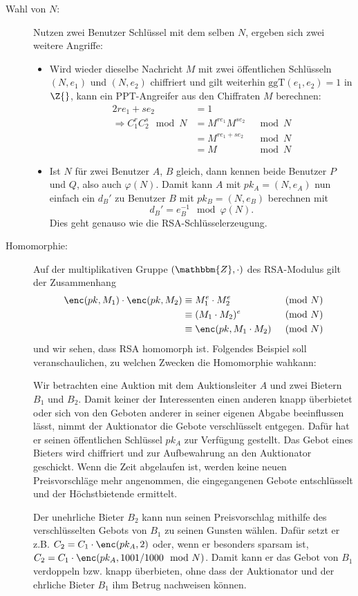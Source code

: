 \begin{description}
\item[Wahl von $N$:] 
  Nutzen zwei Benutzer Schlüssel mit dem selben $N$, ergeben sich zwei
  weitere Angriffe:
  \begin{itemize}
  \item Wird wieder dieselbe Nachricht $M$ mit zwei
    öffentlichen Schlüsseln $(N, e_1)$ und $(N, e_2)$ chiffriert und
    gilt weiterhin $\text{ggT}(e_1, e_2) = 1$ in $\Z{}$, kann ein
    PPT-Angreifer aus den Chiffraten $M$ berechnen:
    \begin{alignat*}{2}
      re_1 + se_2 & = 1\\ 
      \Longrightarrow C_1^rC_2^s \mod N &= M^{re_1}M^{se_2} &\mod N\\
                  &= M^{re_1 + se_2} &\mod N\\
                  &= M &\mod N
    \end{alignat*}
  \item
    Ist $N$ für zwei Benutzer $A$, $B$ gleich, dann kennen beide Benutzer $P$ und
    $Q$, also auch $\varphi(N)$. Damit kann $A$ mit $pk_A = (N, e_A)$
    nun einfach ein $d_B'$ zu Benutzer $B$ mit $pk_B = (N, e_B)$
    berechnen mit 
    \[d_B'=e_B^{-1} \mod \varphi(N).\]
    Dies geht genauso wie die RSA-Schlüsselerzeugung.
  \end{itemize}    
\item[Homomorphie:] Auf der multiplikativen Gruppe $(\mathbbm{Z}, \cdot)$ des RSA-Modulus gilt der Zusammenhang
  \begin{alignat*}{2}
      \enc(pk, M_1) \cdot \enc(pk, M_2) &\equiv M_1^e \cdot M_2^e &
      \pmod N \\
      &\equiv (M_1 \cdot M_2)^e & \pmod N\\
      &\equiv \enc(pk, M_1 \cdot M_2) & \pmod N
  \end{alignat*}
  und wir sehen, dass RSA homomorph ist. 
  Folgendes Beispiel soll veranschaulichen, zu welchen Zwecken die Homomorphie wahkann:   
    \begin{beispiel}
    	Wir betrachten eine Auktion mit dem Auktionsleiter $A$ und zwei Bietern $B_1$ und $B_2$. Damit keiner der Interessenten einen
    	anderen knapp überbietet oder sich von den Geboten anderer in seiner eigenen Abgabe beeinflussen lässt, nimmt der Auktionator die Gebote verschlüsselt entgegen. Dafür hat er seinen öffentlichen Schlüssel $pk_A$ zur Verfügung gestellt. Das Gebot eines Bieters wird chiffriert und zur Aufbewahrung an den Auktionator geschickt. Wenn die Zeit abgelaufen ist, werden keine neuen Preisvorschläge mehr angenommen, die eingegangenen Gebote entschlüsselt und der Höchstbietende ermittelt.
    
    	Der unehrliche Bieter $B_2$ kann nun seinen Preisvorschlag mithilfe des verschlüsselten Gebots von $B_1$ zu seinen Gunsten wählen. Dafür setzt er z.B. $C_2 =
    	C_1 \cdot \enc({pk_A, 2})$ oder, wenn er besonders sparsam ist, $C_2 = C_1 \cdot \enc({pk_A, 1001/1000 \mod N})$. Damit kann er das Gebot von $B_1$ verdoppeln
    	bzw. knapp überbieten, ohne dass der Auktionator und der ehrliche Bieter $B_1$ ihm Betrug nachweisen können.
    \end{beispiel}
\end{description} 

